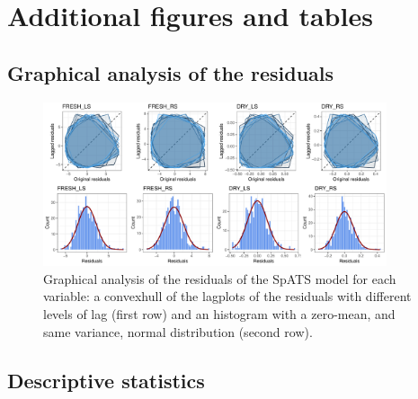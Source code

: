 \clearpage

\chapter{Additional figures and tables}
\section{Graphical analysis of the residuals}
\label{appendix:residuals}

\begin{figure}
	\includegraphics[width = 0.9\textwidth]{../../Figures/residuals_analysis_plot.pdf}
	\caption[Graphical analysis of the residuals og the SpATS model]{Graphical analysis of the residuals of the SpATS model for each variable: a convexhull of the lagplots of the residuals with different levels of lag (first row) and an histogram with a zero-mean, and same variance, normal distribution (second row).}
	\label{fig:residuals_analysis_plot}
\end{figure}

\section{Descriptive statistics}
\label{appendix:mean_std_table}

